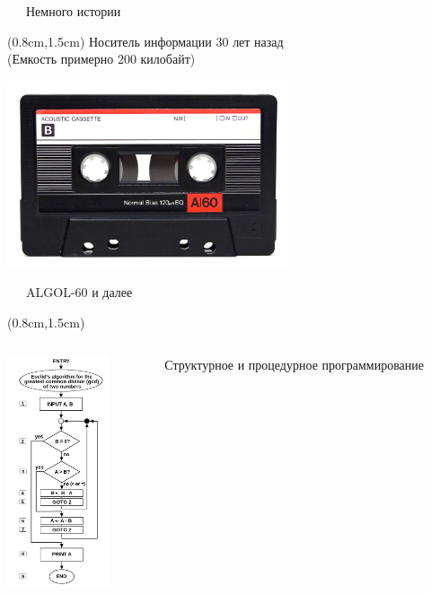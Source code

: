\documentclass[xetex,18pt,aspectratio=43]{beamer}
\begin{document}
\begin{Large}
\begin{frame}{\ \ \ Немного истории}
\begin{textblock*}{\framewidth}(0.8cm,1.5cm) %
Носитель информации 30 лет назад\\
{\small (Емкость примерно 200 килобайт)}
\begin{minipage}{\textwidth}
  \centering
  \includegraphics[height=5.5cm]{img/cassette}
\end{minipage}
\end{textblock*}
\end{frame}

\begin{frame}{\ \ \ ALGOL-60 и далее}
\begin{textblock*}{\framewidth}(0.8cm,1.5cm) %
  \begin{columns}[onlytextwidth,t]
    \begin{column}{0.5\textwidth}
      \centering
      \includegraphics[height=6.8cm,valign=t]{img/algorithm}
    \end{column}
    \begin{column}{0.5\textwidth}
    Структурное и процедурное программирование
    \end{column}
  \end{columns}
\end{textblock*}
\end{frame}


\end{Large}
\end{document}
